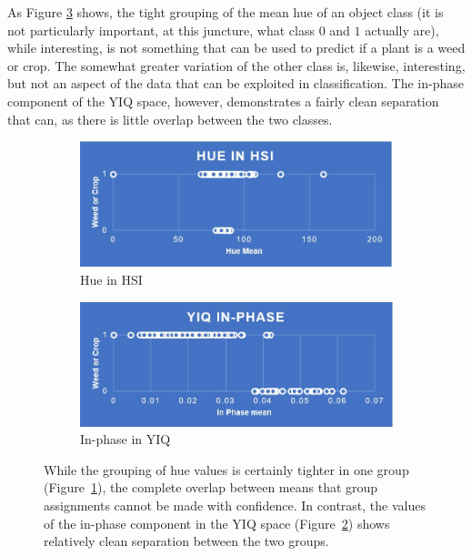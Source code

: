 \documentclass[letterpaper]{article}
\begin{document}
{As Figure \ref{fig:hue_vs_inphase} shows, the tight grouping of the mean hue of an object class (it is not particularly important, at this juncture, what class $0$ and $1$ actually are), while interesting, is not something that can be used to predict if a plant is a weed or crop.  The somewhat greater variation of the other class is, likewise, interesting, but not an aspect of the data that can be exploited in classification. The in-phase component of the YIQ space, however, demonstrates a fairly clean separation that can, as there is little overlap between the two classes.


\begin{figure}[H]
	\begin{subfigure}[h]{0.48\linewidth}
		\includegraphics[width=1\linewidth]{./figures/hsi-hue.jpg}
		\caption{Hue in HSI}
		\label{subfig:hue}	
	\end{subfigure}
	\hfill
	\begin{subfigure}[h]{0.48\linewidth}
		\includegraphics[width=1\linewidth]{./figures/yiq-in-phase.jpg}
		\caption{In-phase in YIQ}
		\label{subfig:in_phase}		
	\end{subfigure}%
	\caption[Prediction using hue in HSI and In-phase in YIQ]{While the grouping of hue values is certainly tighter in one group (Figure~\ref{subfig:hue}), the complete overlap between means that group assignments cannot be made with confidence. In contrast, the values of the in-phase component in the YIQ space (Figure~\ref{subfig:in_phase}) shows relatively clean separation between the two groups.}
	\label{fig:hue_vs_inphase}
\end{figure}



}
\end{document}
